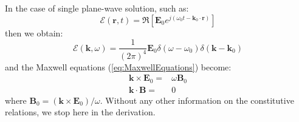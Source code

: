 In the case of single plane-wave solution, such as:
\begin{equation}
\boldsymbol{\mathcal{E}}(\mathbf{r},t)
=
\Re\left[
\mathbf{E}_0
 e^{j(\omega_0 t - \mathbf{k}_0\cdot\mathbf{r})}
\right]
\end{equation}
then we obtain:
\begin{equation}
	\boldsymbol{\mathcal{E}}(\mathbf{k},\omega)
	=
	 	\frac{1}{(2\pi)^4}
	 	\mathbf{E}_0
	 	\delta(\omega - \omega_0) \delta(\mathbf{k} - \mathbf{k}_0) 
\end{equation}
and the Maxwell equations (\ref{eq:MaxwellEquations}) become:
\begin{subequations}
	\begin{align}
	\mathbf{k} \times\mathbf{E}_0
	=& 
	\omega \mathbf{B}_0 
	\\
	\mathbf{k} \cdot \mathbf{B}  
	=& 0
	\end{align}
	\label{eq:k-omegaMaxwellEquationsPhasor}
\end{subequations}
where $\mathbf{B}_0 = (\mathbf{k}\times\mathbf{E}_0)/\omega$. Without any other information on the constitutive relations, we stop here in the derivation.

